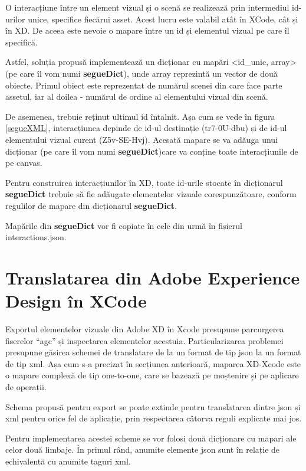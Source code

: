 

O interacțiune între un element vizual și o scenă se realizează prin intermediul id-urilor unice, specifice fiecărui asset. Acest lucru este valabil atât în XCode, cât și în XD. De aceea este nevoie o mapare între un id și elementul vizual pe care îl specifică. 

Astfel, soluția propusă implementează un dicționar cu mapări <id_unic, array> (pe care îl vom numi \textbf{segueDict}), unde array reprezintă un vector de două obiecte. Primul obiect este reprezentat de numărul scenei din care face parte assetul, iar al doilea - numărul de ordine al elementului vizual din scenă.

De asemenea, trebuie reținut ultimul id întalnit. Așa cum se vede în figura \ref{segueXML}, interacțiunea depinde de id-ul destinație (tr7-0U-dbu) și de id-ul elementului vizual curent (Z5v-SE-Hvj). Acesată mapare se va adăuga unui dicționar (pe care îl vom numi \textbf{segueDict})care va conține toate interacțiunile de pe canvas.

Pentru construirea interacțiunilor în XD, toate id-urile stocate în dicționarul \textbf{segueDict} trebuie să fie adăugate elementelor vizuale corespunzătoare, conform regulilor de mapare din dicționarul \textbf{segueDict}.

Mapările din \textbf{segueDict} vor fi copiate în cele din urmă în fișierul interactions.json.

\section{Translatarea din Adobe Experience Design în XCode}

Exportul elementelor vizuale din Adobe XD în Xcode presupune parcurgerea fiserelor “agc”  și inspectarea elementelor acestuia. Particularizarea problemei presupune găsirea schemei de translatare de la un format de tip json la un format de tip xml. Așa cum s-a precizat în secțiunea anterioară, maparea XD-Xcode este o mapare complexă de tip one-to-one, care se bazează pe moștenire și pe aplicare de operații. 

Schema propusă pentru export se poate extinde pentru translatarea dintre json și xml pentru orice fel de aplicație, prin respectarea câtorva reguli explicate mai jos. 

Pentru implementarea acestei scheme se vor folosi două dicționare cu mapari ale celor două limbaje.  În primul rând, anumite elemente json sunt în relație de echivalentă cu anumite taguri xml. 


